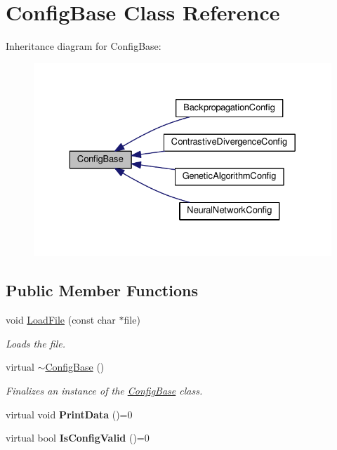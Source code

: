 \hypertarget{class_config_base}{}\section{Config\+Base Class Reference}
\label{class_config_base}


Inheritance diagram for Config\+Base\+:\nopagebreak
\begin{figure}[H]
\begin{center}
\leavevmode
\includegraphics[width=329pt]{class_config_base__inherit__graph}
\end{center}
\end{figure}
\subsection*{Public Member Functions}
\begin{DoxyCompactItemize}
\item 
void \hyperlink{class_config_base_a2a1bfbf33daf2fb6b9f8cf9a059d68b7}{Load\+File} (const char $\ast$file)
\begin{DoxyCompactList}\small\item\em Loads the file. \end{DoxyCompactList}\item 
virtual \hyperlink{class_config_base_a429987eb53dd57fb0467501eb7a6ce80}{$\sim$\+Config\+Base} ()
\begin{DoxyCompactList}\small\item\em Finalizes an instance of the \hyperlink{class_config_base}{Config\+Base} class. \end{DoxyCompactList}\item 
\hypertarget{class_config_base_afd041dbca3845e8e7407f796bd882bdd}{}virtual void {\bfseries Print\+Data} ()=0\label{class_config_base_afd041dbca3845e8e7407f796bd882bdd}

\item 
\hypertarget{class_config_base_af05da2c1950ce4c30e6f16c3bf727a1a}{}virtual bool {\bfseries Is\+Config\+Valid} ()=0\label{class_config_base_af05da2c1950ce4c30e6f16c3bf727a1a}

\end{DoxyCompactItemize}
